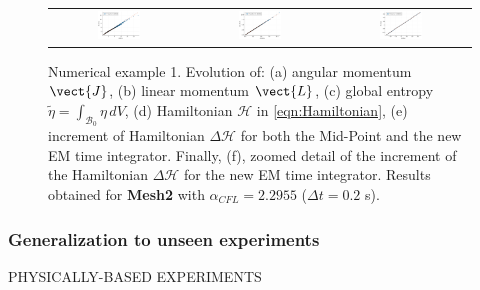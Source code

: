 \begin{figure}[hbtp]
	\centering
	\begin{tabular}{ccc}
		\includegraphics[width=0.33\textwidth]{Figures/PotentialStudy/e_pol_P_CorrelationTest} &
		\includegraphics[width=0.33\textwidth]{Figures/PotentialStudy/e_pol_E0_CorrelationTest} &
		\includegraphics[width=0.33\textwidth]{Figures/PotentialStudy/e_pol_theta_CorrelationTest} \\

	\end{tabular}
	\caption{Numerical example 1. Evolution of: (a) angular momentum $\vect{J}$, (b) linear momentum $\vect{L}$, (c) global entropy $\tilde{\eta}=\int_{\mathcal{B}_0}\eta\,dV$, (d) Hamiltonian $\mathcal{H}$  in \eqref{eqn:Hamiltonian}, (e) increment of Hamiltonian $\Delta\mathcal{H}$ for both the Mid-Point and the new EM time integrator.  Finally, (f), zoomed detail of the increment of the Hamiltonian  $\Delta\mathcal{H}$ for the new EM time integrator. Results obtained for \textbf{Mesh2} with $\alpha_{CFL}=2.2955$ ($\Delta t=0.2$ s).}
	\label{fig:example 1 energy balance}
\end{figure}


\subsubsection{Generalization to unseen experiments}

PHYSICALLY-BASED EXPERIMENTS

